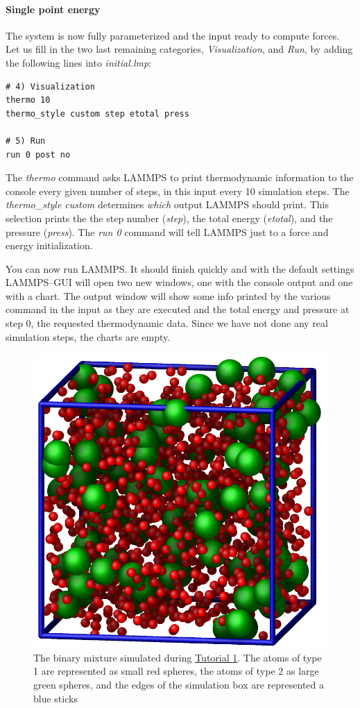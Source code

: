 \documentclass[9pt,tutorial]{livecoms}
\begin{document}
\paragraph{Single point energy}
The system is now fully parameterized and the input ready to compute
forces.  Let us fill in the two last remaining categories,
\textit{Visualization}, and \textit{Run}, by adding the following lines
into \textit{initial.lmp}:
{\normalsize
\begin{verbatim}
# 4) Visualization
thermo 10
thermo_style custom step etotal press

# 5) Run
run 0 post no
\end{verbatim}
}
The \textit{thermo} command asks LAMMPS to print thermodynamic
information to the console every given number of steps, in this input
every 10 simulation steps.  The \textit{thermo\_style custom} determines
\emph{which} output LAMMPS should print.  This selection prints the the
step number (\textit{step}), the total energy (\textit{etotal}), and the
pressure (\textit{press}).  The \textit{run 0} command will tell LAMMPS
just to a force and energy initialization.

You can now run LAMMPS.  It should finish quickly and with the default
settings LAMMPS--GUI will open two new windows, one with the console
output and one with a chart.  The output window will show some info
printed by the various command in the input as they are executed and
the total energy and pressure at step 0, the requested thermodynamic
data.  Since we have not done any real simulation steps, the charts
are empty.

\begin{figure}
\centering
\includegraphics[width=0.55\linewidth]{LJ}
\caption{The binary mixture simulated during \hyperref[lennard-jones-label]{Tutorial 1}.
  The atoms of type 1 are represented as small red spheres, the atoms of type 2 as large
  green spheres, and the edges of the simulation box are represented a blue sticks}
\label{fig:LJ}
\end{figure}
\end{document}
